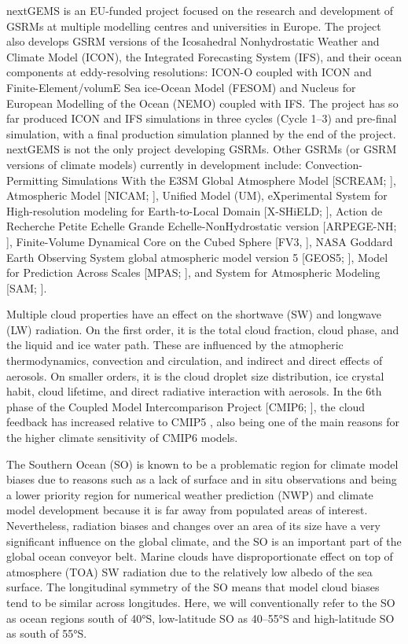 \documentclass[12pt,a4paper]{article}
\begin{document}
nextGEMS is an EU-funded project \citep{nextgems} focused on the research and
development of GSRMs at multiple modelling centres and universities in Europe.
The project also develops GSRM versions of the Icosahedral Nonhydrostatic
Weather and Climate Model (ICON), the Integrated Forecasting System (IFS), and
their ocean components at eddy-resolving resolutions: ICON-O coupled with ICON
and Finite-Element/volumE Sea ice-Ocean Model (FESOM) and Nucleus for European
Modelling of the Ocean (NEMO) coupled with IFS.  The project has so far
produced ICON and IFS simulations in three cycles (Cycle 1--3) and pre-final
simulation, with a final production simulation planned by the end of the
project. nextGEMS is not the only project developing GSRMs. Other GSRMs (or
GSRM versions of climate models) currently in development include:
Convection-Permitting Simulations With the E3SM Global Atmosphere Model
[SCREAM; \cite{caldwell2021}], Atmospheric Model [NICAM; \cite{satoh2008}],
Unified Model (UM), eXperimental System for High-resolution modeling for
Earth-to-Local Domain [X-SHiELD; \cite{shield}], Action de Recherche Petite
Echelle Grande Echelle-NonHydrostatic version [ARPEGE-NH;
\cite{bubnova1995,voldoire2017}], Finite-Volume Dynamical Core on the Cubed
Sphere [FV3, \cite{lin2004}], NASA Goddard Earth Observing System global
atmospheric model version 5 [GEOS5; \cite{putman2011}], Model for Prediction
Across Scales [MPAS; \cite{skamarock2012}], and System for Atmospheric Modeling
[SAM; \cite{khairoutdinov2003}].

Multiple cloud properties have an effect on the shortwave (SW) and longwave
(LW) radiation. On the first order, it is the total cloud fraction, cloud
phase, and the liquid and ice water path. These are influenced by the
atmopheric thermodynamics, convection and circulation, and indirect and direct
effects of aerosols. On smaller orders, it is the cloud droplet size
distribution, ice crystal habit, cloud lifetime, and direct radiative
interaction with aerosols.  In the 6th phase of the Coupled Model
Intercomparison Project [CMIP6; \citep{eyring2016}], the cloud feedback has
increased relative to CMIP5 \citep{zelinka2020}, also being one of the main
reasons for the higher climate sensitivity of CMIP6 models.

The Southern Ocean (SO) is known to be a problematic region for climate model
biases due to reasons such as a lack of surface and in situ observations and
being a lower priority region for numerical weather prediction (NWP) and
climate model development because it is far away from populated areas of
interest.  Nevertheless, radiation biases and changes over an area of its size
have a very significant influence on the global climate, and the SO is an
important part of the global ocean conveyor belt.  Marine clouds have
disproportionate effect on top of atmosphere (TOA) SW radiation due to the
relatively low albedo of the sea surface.  The longitudinal symmetry of the SO
means that model cloud biases tend to be similar across longitudes.  Here, we
will conventionally refer to the SO as ocean regions south of 40°S,
low-latitude SO as 40--55°S and high-latitude SO as south of 55°S.
\end{document}
